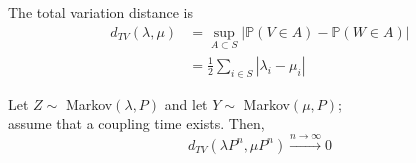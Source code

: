 \documentclass{article}
\begin{document}
The total variation distance is 
\begin{align*}
    d_{TV}(\lambda,\mu) &= \sup_{A \subset S} |\mathbb{P}(V \in A) - \mathbb{P}(W \in A)| \\
    &= \frac{1}{2} \sum_{i \in S} |\lambda_i - \mu_i|
\end{align*}
\begin{proposition}
    \label{totvardist}
        Let $Z \sim$ Markov$(\lambda, P)$ and 
        let $Y \sim$ Markov$(\mu, P)$; \\
        assume that a coupling time exists. Then,
        \begin{equation*}
            d_{TV}(\lambda P^n, \mu P^n) \xrightarrow{n \rightarrow \infty} 0
        \end{equation*}
\end{proposition}
\end{document}
